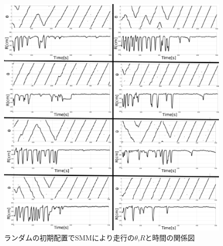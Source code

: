 \vspace{-4mm}
\begin{figure}[!ht]
    \centering
    \includegraphics[width=1.0\linewidth]{smm_shita_R_rand270.eps}
    \caption{ランダムの初期配置でSMMにより走行の$\theta$,$R$と時間の関係図}
    \label{diaRshita_270}
\end{figure}

